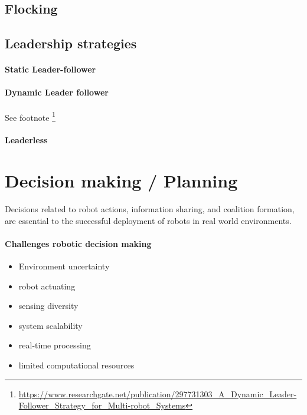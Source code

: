 \documentclass{article}
\begin{document}
    	\subsection{Flocking}
    	\subsection{Leadership strategies}
	    	\paragraph{Static Leader-follower}
	    	\paragraph{Dynamic Leader follower}
	    		See footnote \footnote{\url{https://www.researchgate.net/publication/297731303_A_Dynamic_Leader-Follower_Strategy_for_Multi-robot_Systems}}
	    	\paragraph{Leaderless}
	    		\cite{mohammadi-2018-decentralized-motion-control-in-a-cabled-based-multi-drone-load-transport-system,mohammadi-2020-control-of-multiple-quad-copters-with-a-cable-suspended-payload-subject-to-disturbances}
	    		\cite{rezaee-2017-almost-sure-attitude-consensus-in-multispacecraft-systems-with-stochastic-communication-links}
    \section{Decision making / Planning} 
    	Decisions related to robot actions, information sharing, and coalition formation, are essential to the successful deployment of robots in real world environments.
    	
    	\paragraph{Challenges robotic decision making}
    		\begin{itemize}
    			\item Environment uncertainty
    			\item robot actuating
    			\item sensing diversity
    			\item system scalability
    			\item real-time processing
    			\item limited computational resources
    		\end{itemize}
\end{document}
